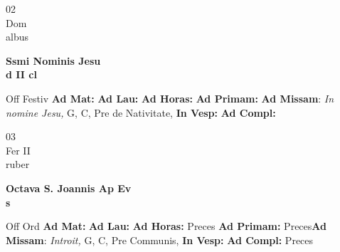 \documentclass[10pt, openany]{book}
\begin{document}
        \begin{center}
            \begin{minipage}{3.5in}
                \vspace{2em}
                \begin{minipage}{0.5in}
                    {\Huge 02} \\
                    {\normalsize Dom} \\
                    {\normalsize albus}
                \end{minipage}
                \begin{minipage}{3.0in}
                    \textbf{ \large Ssmi Nominis Jesu \\
                    \textnormal{\normalsize d II cl}} \\ 
                \end{minipage}
                \begin{justify}Off Festiv
                    \textbf{Ad Mat: }
                    \textbf{Ad Lau: }
                    \textbf{Ad Horas: }
                    \textbf{Ad Primam: }\textbf{Ad Missam}: \textit{In nomine Jesu,} G, C, Pre de Nativitate,  
                    \textbf{In Vesp: }
                    \textbf{Ad Compl: }
                \end{justify}
            \end{minipage}
        \end{center}
    
        \begin{center}
            \begin{minipage}{3.5in}
                \vspace{2em}
                \begin{minipage}{0.5in}
                    {\Huge 03} \\
                    {\normalsize Fer II} \\
                    {\normalsize ruber}
                \end{minipage}
                \begin{minipage}{3.0in}
                    \textbf{ \large Octava S. Joannis Ap Ev \\
                    \textnormal{\normalsize s}} \\ 
                \end{minipage}
                \begin{justify}Off Ord
                    \textbf{Ad Mat: }
                    \textbf{Ad Lau: }
                    \textbf{Ad Horas: }Preces
                    \textbf{Ad Primam: }Preces\textbf{Ad Missam}: \textit{Introit,} G, C, Pre Communis,  
                    \textbf{In Vesp: }
                    \textbf{Ad Compl: }Preces
                \end{justify}
            \end{minipage}
        \end{center}
    
\end{document}
